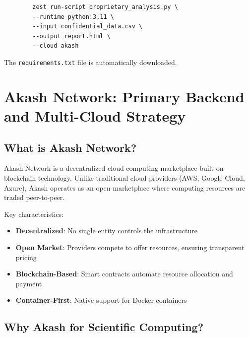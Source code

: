 \documentclass[11pt,a4paper]{article}
\begin{document}
	\begin{lstlisting}
		zest run-script proprietary_analysis.py \
		--runtime python:3.11 \
		--input confidential_data.csv \
		--output report.html \
		--cloud akash
	\end{lstlisting}
	
	The \texttt{requirements.txt} file is automatically downloaded.
	
	\newpage
	
	\section{Akash Network: Primary Backend and Multi-Cloud Strategy}
	
	\subsection{What is Akash Network?}
	
	Akash Network is a decentralized cloud computing marketplace built on blockchain technology. Unlike traditional cloud providers (AWS, Google Cloud, Azure), Akash operates as an open marketplace where computing resources are traded peer-to-peer.
	
	Key characteristics:
	\begin{itemize}
		\item \textbf{Decentralized}: No single entity controls the infrastructure
		\item \textbf{Open Market}: Providers compete to offer resources, ensuring transparent pricing
		\item \textbf{Blockchain-Based}: Smart contracts automate resource allocation and payment
		\item \textbf{Container-First}: Native support for Docker containers
	\end{itemize}
	
	\subsection{Why Akash for Scientific Computing?}
	
\end{document}
